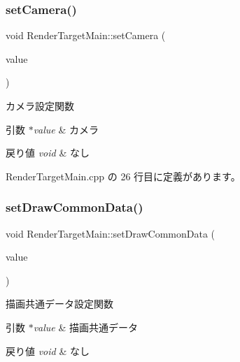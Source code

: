\subsubsection{\texorpdfstring{set\+Camera()}{setCamera()}}
{\footnotesize\ttfamily void Render\+Target\+Main\+::set\+Camera (\begin{DoxyParamCaption}\item[{\mbox{\hyperlink{class_camera}{Camera}} $\ast$}]{value }\end{DoxyParamCaption})}



カメラ設定関数 


\begin{DoxyParams}{引数}
{\em $\ast$value} & カメラ \\
\hline
\end{DoxyParams}

\begin{DoxyRetVals}{戻り値}
{\em void} & なし \\
\hline
\end{DoxyRetVals}


 Render\+Target\+Main.\+cpp の 26 行目に定義があります。

\mbox{\label{class_render_target_main_a374684a81401904fbc94c748312d278b}} 
\subsubsection{\texorpdfstring{set\+Draw\+Common\+Data()}{setDrawCommonData()}}
{\footnotesize\ttfamily void Render\+Target\+Main\+::set\+Draw\+Common\+Data (\begin{DoxyParamCaption}\item[{\mbox{\hyperlink{class_draw_common_data}{Draw\+Common\+Data}} $\ast$}]{value }\end{DoxyParamCaption})}



描画共通データ設定関数 


\begin{DoxyParams}{引数}
{\em $\ast$value} & 描画共通データ \\
\hline
\end{DoxyParams}

\begin{DoxyRetVals}{戻り値}
{\em void} & なし \\
\hline
\end{DoxyRetVals}


